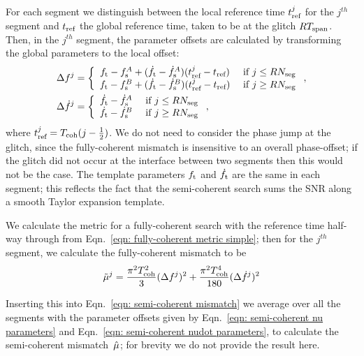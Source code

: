 \documentclass[../full_thesis/full_thesis.tex]{subfiles}
\begin{document}
For each segment we distinguish between the local reference time $t_{\textrm{ref}}^j$ for
the $j^{th}$ segment and $t_{\textrm{ref}}$ the global reference time, taken to be at the
glitch $RT_{\mathrm{span}}$. Then, in the $j^{th}$ segment, the parameter offsets are calculated
by transforming the global parameters to the local offset:
\begin{align}
\Delta f^j & = \left\{
\begin{array}{cc}
{f_{\textrm{t}}} - f_{\textrm{s}}^A + (\dot{f}_{\textrm{t}} - \dot{f}_{\textrm{s}}^A)(t_{\textrm{ref}}^{j} - t_{\textrm{ref}})& \textrm{ if } j \le RN_{\textrm{seg}} \\
{f_{\textrm{t}}} - f_{\textrm{s}}^B + (\dot{f}_{\textrm{t}} - \dot{f}_{\textrm{s}}^B)(t_{\textrm{ref}}^{j} - t_{\textrm{ref}})& \textrm{ if } j \ge RN_{\textrm{seg}}
\end{array}\right.,
\label{eqn: semi-coherent nu parameters}
\\
\Delta\dot{f}^j &= \left\{
\begin{array}{cc}
\dot{f}_{\textrm{t}} - \dot{f}_{\textrm{s}}^A & \textrm{ if } j \le RN_{\textrm{seg}} \\
\dot{f}_{\textrm{t}} - \dot{f}_{\textrm{s}}^B & \textrm{ if } j \ge RN_{\textrm{seg}}
\end{array}\right.,
\label{eqn: semi-coherent nudot parameters}
\end{align}
where $t_{\textrm{ref}}^{j} = T_{\mathrm{coh}}(j - \frac{1}{2})$. We do not need to consider the
phase jump at the glitch, since the fully-coherent mismatch is insensitive
to an overall phase-offset; if the glitch did not occur
at the interface between two segments then this would not be the case.  The
template parameters ${f_{\textrm{t}}}$ and $\dot{f}_{\textrm{t}}$ are the same in each segment; this
reflects the fact that the semi-coherent search sums the SNR along a smooth
Taylor expansion template.

We calculate the metric for a fully-coherent search with the reference time
half-way through from Eqn.~\eqref{eqn: fully-coherent metric simple}; then for
the $j^{th}$ segment, we calculate the fully-coherent mismatch to be
\begin{align}
\tilde{\mu}^j = \frac{\pi^{2}T_{\mathrm{coh}}^{2}}{3} (\Delta f^{j})^{2}
+ \frac{\pi^{2}T_{\mathrm{coh}}^{4}}{180}(\Delta\dot{f}^j)^{2}
\end{align}

Inserting this into Eqn.~\eqref{eqn: semi-coherent mismatch} we average over all
the segments with the parameter offsets given by Eqn.~\eqref{eqn: semi-coherent
nu parameters} and Eqn.~\eqref{eqn: semi-coherent nudot parameters}, to calculate
the semi-coherent mismatch~$\hat{\mu}$; for brevity we do not provide the result here.
\end{document}
